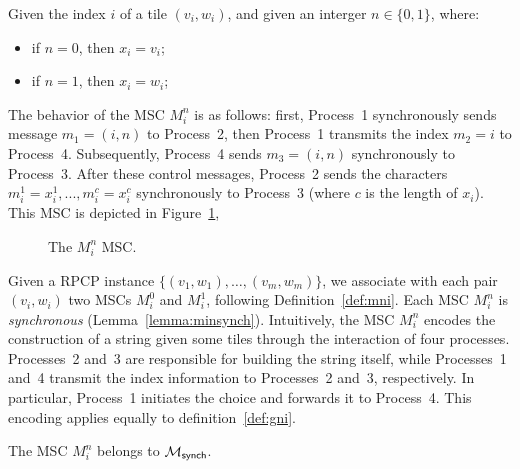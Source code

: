 \begin{definition}[$M^n_i$]\label{def:mni}
	Given the index $i$ of a tile $(v_i, w_i)$, and
	given an interger $n\in\{0,1\}$, where:
	\begin{itemize}
		\item if $n=0$, then $x_i=v_i$;
		\item if $n=1$, then $x_i=w_i$;
	\end{itemize}
	The behavior of the MSC $M^n_i$ is as follows:
	first, Process~1 synchronously sends message
	$m_1 = (i, n)$ to Process~2, then Process~1 transmits the index $m_2=i$
	to Process~4. Subsequently, Process~4 sends $m_3 = (i, n)$
	synchronously to Process~3. After these control messages, Process~2
	sends the characters $m_i^1 = x_i^1,..., m_i^c = x_i^c$
	synchronously to Process~3 (where $c$ is the length of $x_i$).
	This MSC is depicted in Figure~\ref{fig:mni}, 

	\begin{figure}[!ht]
		\centering
		\begin{msc}[draw frame=none, draw head=none, msc keyword=, head height=0px, label distance=0.5ex, foot height=0px, foot distance=0px]{}

		\end{msc}
		\caption{The $M_i^n$ MSC.}
		\label{fig:mni}
	\end{figure}

\end{definition}

Given a RPCP instance $\{(v_1,w_1),\ldots,(v_m,w_m)\}$, we associate  
with each pair $(v_i,w_i)$ two MSCs $M^0_i$ and $M^1_i$, following  
Definition~\ref{def:mni}. Each MSC $M^n_i$ is \emph{synchronous}  
(Lemma~\ref{lemma:minsynch}). Intuitively, the MSC $M_i^n$ encodes the  
construction of a string given some tiles through the interaction of four processes.  
Processes~2 and~3 are responsible for building the string itself,  
while Processes~1 and~4 transmit the index information to Processes~2  
and~3, respectively. In particular, Process~1 initiates the choice and  
forwards it to Process~4. This encoding applies equally to definition~\ref{def:gni}.

\bigskip

\begin{lemma}\label{lemma:minsynch}
	The MSC $M_i^n$ belongs to $\mathcal{M}_{\mathsf{synch}}$.
\end{lemma}

